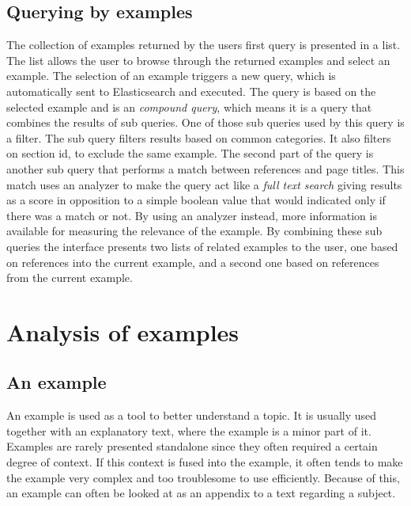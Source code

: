 \subsection{Querying by examples}
The collection of examples returned by the users first query is presented in a list. The list allows the user to browse through the returned examples and select an example. The selection of an example triggers a new query, which is automatically sent to Elasticsearch and executed. The query is based on the selected example and is an \textit{compound query}, which means it is a query that combines the results of sub queries. One of those sub queries used by this query is a filter. The sub query filters results based on common categories. It also filters on section id, to exclude the same example. The second part of the query is another sub query that performs a match between references and page titles. This match uses an analyzer to make the query act like a \textit{full text search} giving results as a score in opposition to a simple boolean value that would indicated only if there was a match or not. By using an analyzer instead, more information is available for measuring the relevance of the example.
By combining these sub queries the interface presents two lists of related examples to the user, one based on references into the current example, and a second one based on references from the current example. %

\section{Analysis of examples} \label{examples-section} %

\subsection{An example}

An example is used as a tool to better understand a topic. It is usually used together with an explanatory text, where the example is a minor part of it. Examples are rarely presented standalone since they often required a certain degree of context. If this context is fused into the example, it often tends to make the example very complex and too troublesome to use efficiently. Because of this, an example can often be looked at as an appendix to a text regarding a subject. 

